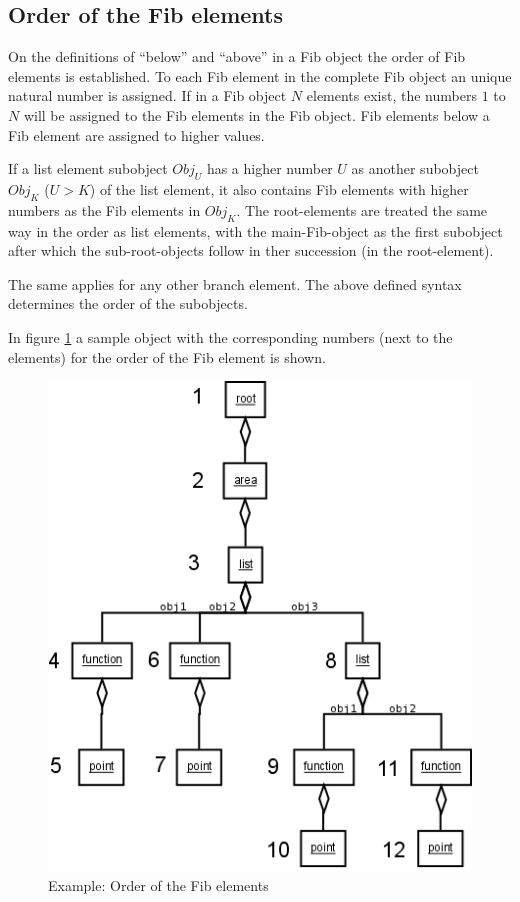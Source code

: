 \subsection{Order of the Fib elements}
\label{secOrderFibElements}

On the definitions of ``below'' and ``above'' in a Fib object the order of Fib elements is established. To each Fib element in the complete Fib object an unique natural number is assigned. If in a Fib object $N$ elements exist, the numbers $1$ to $N$ will be assigned to the Fib elements in the Fib object. Fib elements below a Fib element are assigned to higher values.

If a list element subobject $Obj_U$ has a higher number $U$ as another subobject $Obj_K$ ($U>K$) of the list element, it also contains Fib elements with higher numbers as the Fib elements in $Obj_K$. The root-elements are treated the same way in the order as list elements, with the main-Fib-object as the first subobject after which the sub-root-objects follow in ther succession (in the root-element).

The same applies for any other branch element. The above defined syntax determines the order of the subobjects.

In figure \ref{figOrderFibElements} a sample object with the corresponding numbers (next to the elements) for the order of the Fib element is shown.

\begin{figure}[htbp]
\begin{center}
  \includegraphics[scale=0.5]{order_elements}
\end{center}
\caption{Example: Order of the Fib elements}
\label{figOrderFibElements}
\end{figure}


